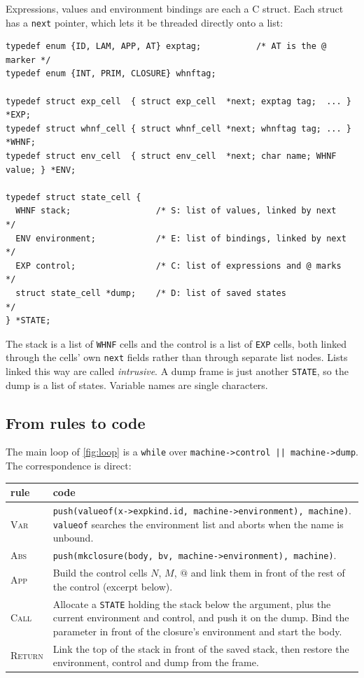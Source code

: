 \documentclass[11pt,a4paper]{article}
\makeatletter
\newcommand{\ap}{\mathtt{@}}
\newcommand{\rul}[1]{\textsc{#1}}
\theoremstyle{definition}
\theoremstyle{plain}
\makeatother
\begin{document}
Expressions, values and environment bindings are each a C struct. Each struct
has a \texttt{next} pointer, which lets it be threaded directly onto a list:
\begin{lstlisting}
typedef enum {ID, LAM, APP, AT} exptag;           /* AT is the @ marker */
typedef enum {INT, PRIM, CLOSURE} whnftag;

typedef struct exp_cell  { struct exp_cell  *next; exptag tag;  ... } *EXP;
typedef struct whnf_cell { struct whnf_cell *next; whnftag tag; ... } *WHNF;
typedef struct env_cell  { struct env_cell  *next; char name; WHNF value; } *ENV;

typedef struct state_cell {
  WHNF stack;                 /* S: list of values, linked by next   */
  ENV environment;            /* E: list of bindings, linked by next */
  EXP control;                /* C: list of expressions and @ marks  */
  struct state_cell *dump;    /* D: list of saved states             */
} *STATE;
\end{lstlisting}
The stack is a list of \texttt{WHNF} cells and the control is a list of
\texttt{EXP} cells, both linked through the cells' own \texttt{next} fields
rather than through separate list nodes. Lists linked this way are called
\emph{intrusive}. A dump frame is just another \texttt{STATE}, so the dump is
a list of states. Variable names are single characters.

\subsection{From rules to code}

The main loop of \cref{fig:loop} is a \texttt{while} over
\texttt{machine->control || machine->dump}. The correspondence is direct:

\begin{center}
\small
\begin{tabularx}{\linewidth}{@{}l X@{}}
\toprule
rule & code\\
\midrule
\rul{Var} & \texttt{push(valueof(x->expkind.id, machine->environment), machine)}. \texttt{valueof} searches the environment list and aborts when the name is unbound.\\
\rul{Abs} & \texttt{push(mkclosure(body, bv, machine->environment), machine)}.\\
\rul{App} & Build the control cells $N$, $M$, $\ap$ and link them in front of the rest of the control (excerpt below).\\
\rul{Call} & Allocate a \texttt{STATE} holding the stack below the argument, plus the current environment and control, and push it on the dump. Bind the parameter in front of the closure's environment and start the body.\\
\rul{Return} & Link the top of the stack in front of the saved stack, then restore the environment, control and dump from the frame.\\
\bottomrule
\end{tabularx}
\end{center}
\end{document}
